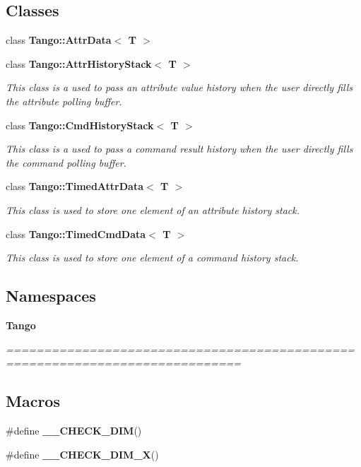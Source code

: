 \subsection*{Classes}
\begin{DoxyCompactItemize}
\item 
class {\bf Tango\-::\-Attr\-Data$<$ T $>$}
\item 
class {\bf Tango\-::\-Attr\-History\-Stack$<$ T $>$}
\begin{DoxyCompactList}\small\item\em This class is a used to pass an attribute value history when the user directly fills the attribute polling buffer. \end{DoxyCompactList}\item 
class {\bf Tango\-::\-Cmd\-History\-Stack$<$ T $>$}
\begin{DoxyCompactList}\small\item\em This class is a used to pass a command result history when the user directly fills the command polling buffer. \end{DoxyCompactList}\item 
class {\bf Tango\-::\-Timed\-Attr\-Data$<$ T $>$}
\begin{DoxyCompactList}\small\item\em This class is used to store one element of an attribute history stack. \end{DoxyCompactList}\item 
class {\bf Tango\-::\-Timed\-Cmd\-Data$<$ T $>$}
\begin{DoxyCompactList}\small\item\em This class is used to store one element of a command history stack. \end{DoxyCompactList}\end{DoxyCompactItemize}
\subsection*{Namespaces}
\begin{DoxyCompactItemize}
\item 
{\bf Tango}
\begin{DoxyCompactList}\small\item\em ============================================================================= \end{DoxyCompactList}\end{DoxyCompactItemize}
\subsection*{Macros}
\begin{DoxyCompactItemize}
\item 
\#define {\bf \-\_\-\-\_\-\-C\-H\-E\-C\-K\-\_\-\-D\-I\-M}()
\item 
\#define {\bf \-\_\-\-\_\-\-C\-H\-E\-C\-K\-\_\-\-D\-I\-M\-\_\-\-X}()
\end{DoxyCompactItemize}


